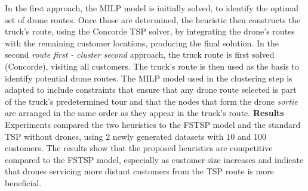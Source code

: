 \documentclass{article}
\begin{document}
	In the first approach, the MILP model is initially solved, to identify the optimal set of drone routes. Once those are determined, the heuristic then constructs the truck's route, using the Concorde TSP solver, by integrating the drone's routes with the remaining customer locations, producing the final solution. In the second \textit{route first - cluster second} approach, the truck route is first solved (Concorde), visiting all customers. The truck's route is then used as the basis to identify potential drone routes. The MILP model used in the clustering step is adapted to include constraints that ensure that any drone route selected is part of the truck's predetermined tour and that the nodes that form the drone \textit{sortie} are arranged in the same order as they appear in the truck's route. \textbf{Results} Experiments compared the two heuristics to the FSTSP model and the standard TSP without drones, using 2 newly generated datasets with 10 and 100 customers. The results show that the proposed heuristics are competitive compared to the FSTSP model, especially as customer size increases and indicate that drones servicing more distant customers from the TSP route is more beneficial.
	\par
\end{document}
